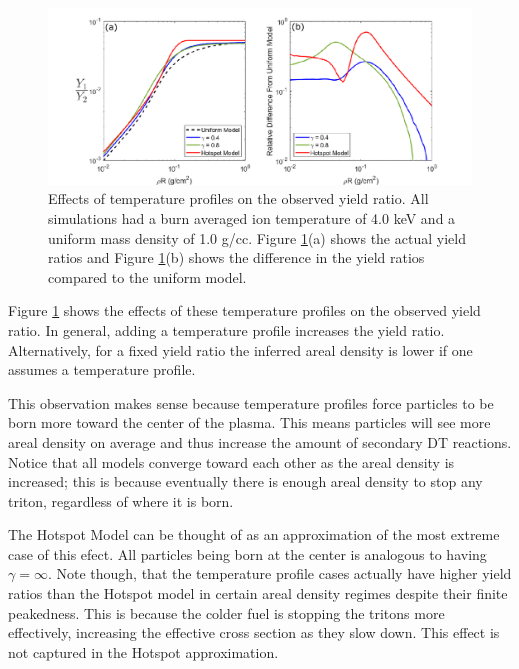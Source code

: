 	    \begin{figure}[h!]
	        \centering
	        \includegraphics[scale=0.9]{Figures/yieldRatioProfiles.pdf}
	        \caption[Profile Effects on Yield Ratios]{Effects of temperature profiles on the observed yield ratio. All simulations had a burn averaged ion temperature of 4.0 keV and a uniform mass density of 1.0 g/cc. Figure \ref{fig:yieldRatioProfiles}(a) shows the actual yield ratios and Figure \ref{fig:yieldRatioProfiles}(b) shows the difference in the yield ratios compared to the uniform model. }
	        \label{fig:yieldRatioProfiles}
	    \end{figure}
	    
	    Figure \ref{fig:yieldRatioProfiles} shows the effects of these temperature profiles on the observed yield ratio. In general, adding a temperature profile increases the yield ratio. Alternatively, for a fixed yield ratio the inferred areal density is lower if one assumes a temperature profile. 
	    
	    This observation makes sense because temperature profiles force particles to be born more toward the center of the plasma. This means particles will see more areal density on average and thus increase the amount of secondary DT reactions. Notice that all models converge toward each other as the areal density is increased; this is because eventually there is enough areal density to stop any triton, regardless of where it is born. 
	    
	    The Hotspot Model can be thought of as an approximation of the most extreme case of this efect. All particles being born at the center is analogous to having $\gamma=\infty$. Note though, that the temperature profile cases actually have higher yield ratios than the Hotspot model in certain areal density regimes despite their finite peakedness. This is because the colder fuel is stopping the tritons more effectively, increasing the effective cross section as they slow down. This effect is not captured in the Hotspot approximation. 
	    
